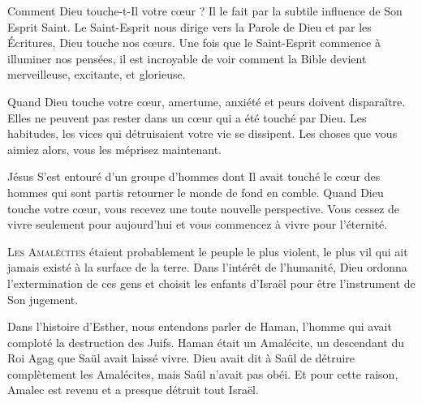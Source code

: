 Comment Dieu touche-t-Il votre c\oe{}ur ?
 Il le fait par la subtile influence de Son Esprit Saint. 
 Le Saint-Esprit nous dirige vers la Parole de Dieu et par les Écritures,
 Dieu touche nos c\oe{}urs.
 Une fois que le Saint-Esprit commence à illuminer nos pensées,
 il est incroyable de voir comment la Bible devient merveilleuse,
 excitante, et glorieuse.

Quand Dieu touche votre c\oe{}ur, amertume, anxiété et peurs doivent disparaître.
 Elles ne peuvent pas rester dans un c\oe{}ur qui a été touché par Dieu.
 Les habitudes, les vices qui détruisaient votre vie se dissipent.
 Les choses que vous aimiez alors, vous les méprisez maintenant.


Jésus S'est entouré d'un groupe d'hommes dont Il avait touché le c\oe{}ur
 \ocadr des hommes qui sont partis retourner le monde de fond en comble.
 Quand Dieu touche votre c\oe{}ur, vous recevez une toute nouvelle perspective.
 Vous cessez de vivre seulement pour aujourd'hui et vous commencez
 à vivre pour l'éternité. 

\dvrule






\lettrine{L}{es Amalécites} étaient probablement le peuple le plus violent,
 le plus vil qui ait jamais existé à la surface de la terre.
 Dans l'intérêt de l'humanité, Dieu ordonna l'extermination de ces gens
 et choisit les enfants d'Israël pour être l'instrument de Son jugement.

Dans l'histoire d'Esther, nous entendons parler de Haman,
 l'homme qui avait comploté la destruction des Juifs.
 Haman était un Amalécite, un descendant du Roi Agag que Saül
 avait laissé vivre.
 Dieu avait dit à Saül de \Og détruire complètement \Fg{} les Amalécites,
 mais Saül n'avait pas obéi.
 Et pour cette raison, Amalec est revenu et a presque détruit tout Israël.

